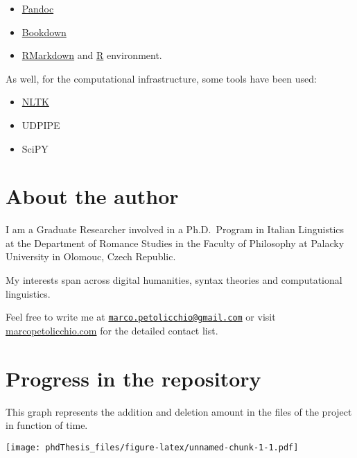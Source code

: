 \documentclass[
  a4paper,
  twoside,
  12pt,
  chapterprefix=false,
  bibliography=totocnumbered,
  listof=flat]{scrbook}
\providecommand{\tightlist}{%
  \setlength{\itemsep}{0pt}\setlength{\parskip}{0pt}}
\begin{document}
\begin{itemize}
\tightlist
\item
  \href{https://bookdown.org}{Pandoc}
\item
  \href{https://bookdown.org}{Bookdown}
\item
  \href{https://bookdown.org}{RMarkdown} and \href{https://bookdown.org}{R} environment.
\end{itemize}

As well, for the computational infrastructure, some tools have been used:

\begin{itemize}
\tightlist
\item
  \href{https://bookdown.org}{NLTK}
\item
  UDPIPE
\item
  SciPY
\end{itemize}

\hypertarget{about-the-author}{%
\section{About the author}\label{about-the-author}}

I am a Graduate Researcher involved in a Ph.D.~Program in Italian Linguistics at the Department of Romance Studies in the Faculty of Philosophy at Palacky University in Olomouc, Czech Republic.

My interests span across digital humanities, syntax theories and computational linguistics.

Feel free to write me at \href{mailto:marco.petolicchio@gmail.com}{\nolinkurl{marco.petolicchio@gmail.com}} or visit \href{http://marcopetolicchio.com}{marcopetolicchio.com} for the detailed contact list.

\hypertarget{progress-in-the-repository}{%
\section{Progress in the repository}\label{progress-in-the-repository}}

This graph represents the addition and deletion amount in the files of the project in function of time.

\texttt{[image: phdThesis\_files/figure-latex/unnamed-chunk-1-1.pdf]}

  
\end{document}
